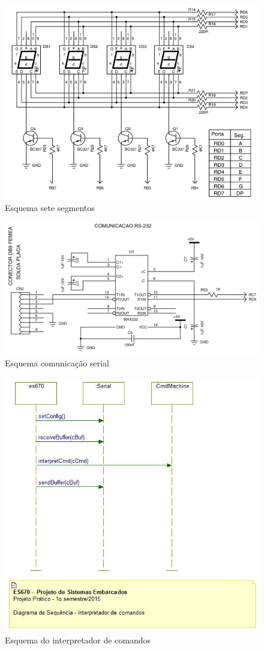 \documentclass{article}
\begin{document}
\begin{figure}[H]
	\centering
	\includegraphics[width=0.9\linewidth]{esq_7seg}
	\caption{Esquema sete segmentos}
	\label{fig:esq_7seg}
\end{figure}
\begin{figure}[H]
	\centering
	\includegraphics[width=0.9\linewidth]{serial}
	\caption{Esquema comunicação serial}
	\label{fig:serial}
\end{figure}
\begin{figure}[H]
	\centering
	\includegraphics[width=0.9\linewidth]{interpretador}
	\caption{Esquema do interpretador de comandos}
	\label{fig:interpretador}
\end{figure}
\end{document}
